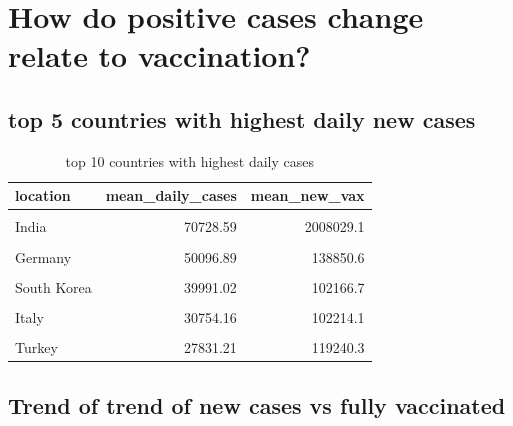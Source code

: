 \documentclass[11pt,a4paper,]{article}
\begin{document}
\clearpage

\section*{ How do positive cases change relate to vaccination?}

\subsection*{top 5 countries with highest daily new cases}

\begin{table}[!h]

\caption{\label{tab:table3}top 10 countries with highest daily cases}
\centering
\begin{tabular}[t]{lrr}
\toprule
location & mean\_daily\_cases & mean\_new\_vax\\
\midrule
\cellcolor{gray!6}{United States} & \cellcolor{gray!6}{120484.50} & \cellcolor{gray!6}{460807.1}\\
India & 70728.59 & 2008029.1\\
\cellcolor{gray!6}{France} & \cellcolor{gray!6}{56648.85} & \cellcolor{gray!6}{114807.6}\\
Germany & 50096.89 & 138850.6\\
\cellcolor{gray!6}{Brazil} & \cellcolor{gray!6}{46861.09} & \cellcolor{gray!6}{372419.6}\\
\addlinespace
South Korea & 39991.02 & 102166.7\\
\cellcolor{gray!6}{United Kingdom} & \cellcolor{gray!6}{38446.46} & \cellcolor{gray!6}{110154.3}\\
Italy & 30754.16 & 102214.1\\
\cellcolor{gray!6}{Russia} & \cellcolor{gray!6}{29094.76} & \cellcolor{gray!6}{203228.0}\\
Turkey & 27831.21 & 119240.3\\
\bottomrule
\end{tabular}
\end{table}

\subsection*{Trend of trend of new cases vs fully vaccinated}
\end{document}
